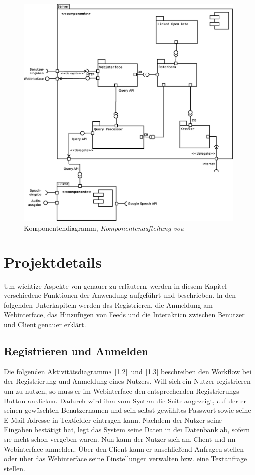 \begin{figure}[h]
\centering
\includegraphics[width=1\textwidth]{Systementwurf/05_implementierungsentwurf/komponenten}
\caption{Komponentendiagramm, \textit{Komponentenaufteilung von \NewsGenie}
\label{komponenten}}
\end{figure}

\FloatBarrier
\section{Projektdetails}

Um wichtige Aspekte von \NewsGenie genauer zu erläutern, werden in diesem
Kapitel verschiedene Funktionen der Anwendung aufgeführt und beschrieben. In den folgenden
Unterkapiteln werden das Registrieren, die Anmeldung am Webinterface, das Hinzufügen von Feeds
 und die Interaktion zwischen Benutzer und Client genauer erklärt.

\subsection{Registrieren und Anmelden}

Die folgenden Aktivitätsdiagramme~\ref{1.2}~und~\ref{1.3} beschreiben den Workflow bei der Registrierung
 und Anmeldung eines Nutzers. Will
sich ein Nutzer registrieren um \NewsGenie zu nutzen, so muss er im Webinterface
den entsprechenden Registrierungs-Button anklicken. Dadurch wird ihm vom System
die Seite angezeigt, auf der er seinen gewüschten Benutzernamen und sein selbst
gewähltes Passwort sowie seine E-Mail-Adresse in Textfelder eintragen kann.
Nachdem der Nutzer seine Eingaben bestätigt hat, legt das System
seine Daten in der Datenbank ab, sofern sie nicht schon vergeben waren.
 Nun kann der Nutzer sich am Client und im
Webinterface anmelden. Über den Client kann er anschließend Anfragen stellen
oder über das Webinterface seine Einstellungen verwalten bzw. eine Textanfrage
stellen.

